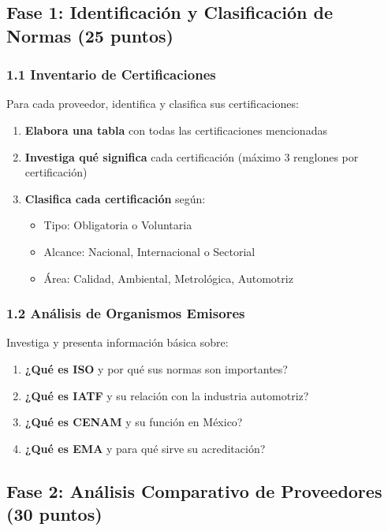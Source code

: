\documentclass{article}
\begin{document}
\subsection*{Fase 1: Identificación y Clasificación de Normas (25 puntos)}

\subsubsection*{1.1 Inventario de Certificaciones}

Para cada proveedor, identifica y clasifica sus certificaciones:
\begin{enumerate}
    \item \textbf{Elabora una tabla} con todas las certificaciones mencionadas
    \item \textbf{Investiga qué significa} cada certificación (máximo 3 renglones por certificación)
    \item \textbf{Clasifica cada certificación} según:
    \begin{itemize}
        \item Tipo: Obligatoria o Voluntaria
        \item Alcance: Nacional, Internacional o Sectorial
        \item Área: Calidad, Ambiental, Metrológica, Automotriz
    \end{itemize}
\end{enumerate}

\subsubsection*{1.2 Análisis de Organismos Emisores}

Investiga y presenta información básica sobre:
\begin{enumerate}
    \item \textbf{¿Qué es ISO} y por qué sus normas son importantes?
    \item \textbf{¿Qué es IATF} y su relación con la industria automotriz?
    \item \textbf{¿Qué es CENAM} y su función en México?
    \item \textbf{¿Qué es EMA} y para qué sirve su acreditación?
\end{enumerate}

\subsection*{Fase 2: Análisis Comparativo de Proveedores (30 puntos)}
\end{document}

